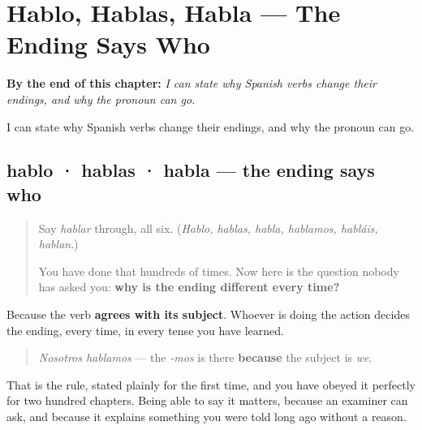 
\chapter{Hablo, Hablas, Habla --- The Ending Says Who}
\label{ch:terminacion}

\begin{chapteropening}
\textbf{By the end of this chapter:} \emph{I can state why Spanish verbs change their endings, and why the pronoun can go.}

I can state why Spanish verbs change their endings, and why the pronoun can go.
\end{chapteropening}

\section[hablo · hablas · habla]{hablo · hablas · habla — the ending says who}

\label{lesson:ES-C66-la-terminacion-dice-quien}



\begin{quote}
Say \emph{hablar} through, all six. (\emph{Hablo, hablas, habla, hablamos, habláis, hablan}.)

You have done that hundreds of times. Now here is the question nobody has asked you: \textbf{why is the ending different every time?}
\end{quote}

\begin{grammarlens}[title={Grammar Lens: naming what you already do}]
Because the verb \textbf{agrees with its subject}. Whoever is doing the action decides the ending, every time, in every tense you have learned.

\begin{quote}
\emph{Nosotros hablamos} — the \emph{-mos} is there \textbf{because} the subject is \emph{we}.
\end{quote}

That is the rule, stated plainly for the first time, and you have obeyed it perfectly for two hundred chapters. Being able to say it matters, because an examiner can ask, and because it explains something you were told long ago without a reason.
\end{grammarlens}

